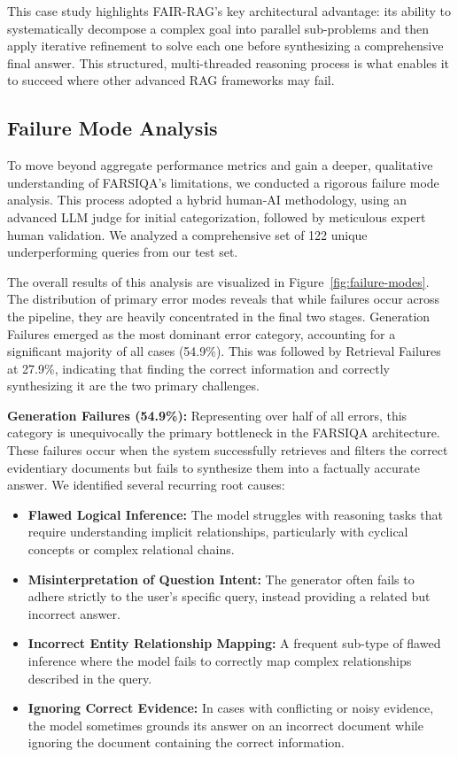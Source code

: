 \documentclass[11pt]{article}
\begin{document}
This case study highlights FAIR-RAG's key architectural advantage: its ability to systematically decompose a complex goal into parallel sub-problems and then apply iterative refinement to solve each one before synthesizing a comprehensive final answer. This structured, multi-threaded reasoning process is what enables it to succeed where other advanced RAG frameworks may fail.

\subsection{Failure Mode Analysis}

To move beyond aggregate performance metrics and gain a deeper, qualitative understanding of FARSIQA's limitations, we conducted a rigorous failure mode analysis. This process adopted a hybrid human-AI methodology, using an advanced LLM judge for initial categorization, followed by meticulous expert human validation. We analyzed a comprehensive set of 122 unique underperforming queries from our test set.

The overall results of this analysis are visualized in Figure~\ref{fig:failure-modes}. The distribution of primary error modes reveals that while failures occur across the pipeline, they are heavily concentrated in the final two stages. Generation Failures emerged as the most dominant error category, accounting for a significant majority of all cases (54.9\%). This was followed by Retrieval Failures at 27.9\%, indicating that finding the correct information and correctly synthesizing it are the two primary challenges.

\textbf{Generation Failures (54.9\%):} Representing over half of all errors, this category is unequivocally the primary bottleneck in the FARSIQA architecture. These failures occur when the system successfully retrieves and filters the correct evidentiary documents but fails to synthesize them into a factually accurate answer. We identified several recurring root causes:

\begin{itemize}
\item \textbf{Flawed Logical Inference:} The model struggles with reasoning tasks that require understanding implicit relationships, particularly with cyclical concepts or complex relational chains.
\item \textbf{Misinterpretation of Question Intent:} The generator often fails to adhere strictly to the user's specific query, instead providing a related but incorrect answer.
\item \textbf{Incorrect Entity Relationship Mapping:} A frequent sub-type of flawed inference where the model fails to correctly map complex relationships described in the query.
\item \textbf{Ignoring Correct Evidence:} In cases with conflicting or noisy evidence, the model sometimes grounds its answer on an incorrect document while ignoring the document containing the correct information.
\end{itemize}
\end{document}
